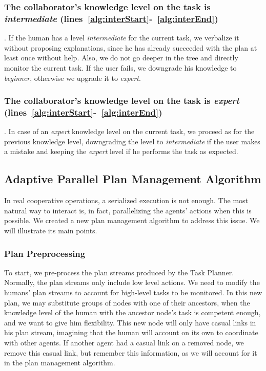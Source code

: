 \subsubsection{The collaborator's knowledge level on the task is \textit{intermediate} (lines~\ref{alg:interStart}-~\ref{alg:interEnd})}. If the human has a level \textit{intermediate} for the current task, we verbalize it without proposing explanations, since he has already  succeeded with the plan at least once without help. Also, we do not go deeper in the tree and directly monitor the current task. If the user  fails, we downgrade his knowledge to \textit{beginner}, otherwise we upgrade it to \textit{expert}.

\subsubsection{The collaborator's knowledge level on the task is \textit{expert} (lines~\ref{alg:interStart}-~\ref{alg:interEnd})}. In case of an \textit{expert} knowledge level on the current task, we  proceed as for the previous knowledge level, downgrading the level to \textit{intermediate} if the user makes a mistake and keeping the \textit{expert} level if he performs the task as expected.


\subsection{Adaptive Parallel Plan Management Algorithm}
\label{subsec:plan_management-adaptive_parallel_plan_manager}
In real cooperative operations, a serialized execution is not enough. The most natural way to interact is, in fact, parallelizing the agents' actions when this is possible. We created a new plan management algorithm to address this issue. We will illustrate its main points.

\subsubsection{Plan Preprocessing}
To start, we pre-process the plan streams produced by the Task Planner. Normally, the plan streams only include low level actions. We need to  modify the humans' plan streams to account for high-level tasks to be monitored. In this new plan, we may substitute groups of nodes with one of their ancestors, when the knowledge level of the human with the ancestor node's task is competent enough, and we want to give him flexibility. This new node will only have casual links in his plan stream, imagining that the human will account on its own to coordinate with other agents. If another agent had a casual link on a removed node, we remove this casual link, but remember this information, as we will account for it in the plan management algorithm.

